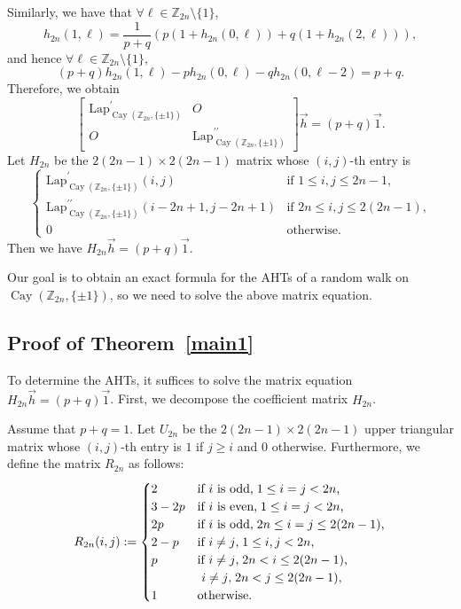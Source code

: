 \documentclass[12pt, leqno]{amsart}
\numberwithin{equation}{section}
\theoremstyle{plain}
\theoremstyle{definition}
\newcommand{\ZZ}{\mathbb{Z}}
\newcommand{\Lap}{\mathrm{Lap}}
\newcommand{\0}{\mathbf{0}}
\DeclareMathOperator{\Cay}{Cay}
\begin{document}
Similarly, we have that $\forall \ell \in\mathbb{Z}_{2n}\setminus\{1\}$, 
\[
h_{2n}(1,\ell)=\frac{1}{p+q}\left(p(1+h_{2n}(0,\ell))+q(1+h_{2n}(2,\ell))\right),
\]
and hence $\forall \ell \in\mathbb{Z}_{2n}\setminus\{1\}$,
\[
(p+q)h_{2n}(1,\ell)-ph_{2n}(0,\ell)-qh_{2n}(0,\ell-2)=p+q.
\] 
Therefore, we obtain
\[
\begin{bmatrix}
\Lap^{\prime}_{\Cay(\ZZ_{2n},\{\pm1\})}&O \\
O&\Lap^{\prime\prime}_{\Cay(\ZZ_{2n},\{\pm1\})}
\end{bmatrix}\vec{h}=(p+q)\vec{1}.
\]
Let $H_{2n}$ be the $2(2n-1)\times 2(2n-1)$ matrix whose $(i,j)$-th entry is
\[
\begin{cases}
\Lap^{\prime}_{\Cay(\ZZ_{2n},\{\pm1\})}(i,j) &\text{if $1\leq i,j\leq 2n-1$,}\\
\Lap^{\prime\prime}_{\Cay(\ZZ_{2n},\{\pm1\})}(i-2n+1,j-2n+1) &\text{if $2n\leq i,j\leq 2(2n-1)$,}\\
0 &\text{otherwise.}
\end{cases}
\]
Then we have $H_{2n} \vec{h}=(p+q)\vec{1}$.

Our goal is to obtain an exact formula for the AHTs of a random walk on $\Cay(\ZZ_{2n},\{\pm1\})$, so we need to solve the above matrix equation.

\subsection{Proof of Theorem~\ref{main1}}

To determine the AHTs, it suffices to solve the matrix equation $H_{2n}\vec{h}=(p+q)\vec{1}$.
First, we decompose the coefficient matrix $H_{2n}$.

Assume that $p+q=1$. Let $U_{2n}$ be the $2(2n-1) \times 2(2n-1)$ upper triangular matrix whose $(i,j)$-th entry is $1$ if $j \geq i$ and $0$ otherwise. Furthermore, we define the matrix $R_{2n}$ as follows:
\[
R_{2n}(i,j):=
\begin{cases}
2 &\text{if $i$ is odd,\;$1\leq i=j<2n$,}\\
3-2p &\text{if $i$ is even,\;$1\leq i=j<2n$,}\\
2p &\text{if $i$ is odd,\;$2n\leq i=j\leq 2(2n-1)$,}\\
2-p &\text{if $i\neq j$,\;$1\leq i,j<2n$,}\\
p &\text{if $i\neq j$,\;$2n<i\leq 2(2n-1)$,}\\
 &\text{ $i\neq j$,\;$2n<j\leq 2(2n-1)$,}\\
1 &\text{otherwise.}
\end{cases}
\]
\end{document}
